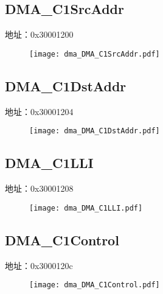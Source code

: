 \subsection{DMA\_C1SrcAddr}
\label{dma-DMA-C1SrcAddr}
地址：0x30001200
 \begin{figure}[H]
\texttt{[image: dma\_DMA\_C1SrcAddr.pdf]}
\end{figure}

\subsection{DMA\_C1DstAddr}
\label{dma-DMA-C1DstAddr}
地址：0x30001204
 \begin{figure}[H]
\texttt{[image: dma\_DMA\_C1DstAddr.pdf]}
\end{figure}

\subsection{DMA\_C1LLI}
\label{dma-DMA-C1LLI}
地址：0x30001208
 \begin{figure}[H]
\texttt{[image: dma\_DMA\_C1LLI.pdf]}
\end{figure}

\subsection{DMA\_C1Control}
\label{dma-DMA-C1Control}
地址：0x3000120c
 \begin{figure}[H]
\texttt{[image: dma\_DMA\_C1Control.pdf]}
\end{figure}

